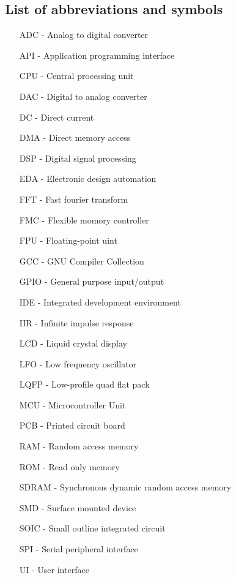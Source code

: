 \documentclass[a4paper,twoside,12pt]{book}
\begin{document}
\begin{appendices} 

\chapter*{List of abbreviations and symbols}

\begin{itemize}
\item[ADC] - Analog to digital converter
\item[API] - Application programming interface
\item[CPU] - Central processing unit
\item[DAC] - Digital to analog converter
\item[DC] - Direct current
\item[DMA] - Direct memory access
\item[DSP] - Digital signal processing
\item[EDA] - Electronic design automation
\item[FFT] - Fast fourier transform
\item[FMC] - Flexible momory controller
\item[FPU] - Floating-point uint
\item[GCC] - GNU Compiler Collection
\item[GPIO] - General purpose input/output
\item[IDE] - Integrated development environment
\item[IIR] - Infinite impulse response
\item[LCD] - Liquid crystal display
\item[LFO] - Low frequency oscillator
\item[LQFP] - Low-profile quad flat pack
\item[MCU] - Microcontroller Unit
\item[PCB] - Printed circuit board
\item[RAM] - Random access memory
\item[ROM] - Read only memory
\item[SDRAM] - Synchronous dynamic random access memory
\item[SMD] - Surface mounted device
\item[SOIC] - Small outline integrated circuit
\item[SPI] - Serial peripheral interface
\item[UI] - User interface
\end{itemize}


\end{appendices}
\end{document}
